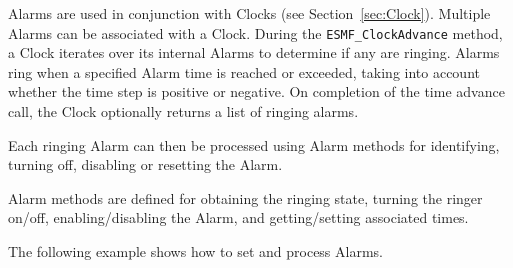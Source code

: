 
Alarms are used in conjunction with Clocks (see Section~\ref{sec:Clock}).
Multiple Alarms can be associated with a Clock.  During the
{\tt ESMF\_ClockAdvance} method, a Clock iterates over its internal Alarms
to determine if any are ringing.  Alarms ring when a specified Alarm 
time is reached or exceeded, taking into account whether the time step is
positive or negative.  On completion of the time advance call, the Clock
optionally returns a list of ringing alarms.

Each ringing Alarm can then be processed using Alarm methods for identifying,
turning off, disabling or resetting the Alarm.

Alarm methods are defined for obtaining the ringing state, turning the
ringer on/off, enabling/disabling the Alarm, and getting/setting 
associated times.

The following example shows how to set and process Alarms.
